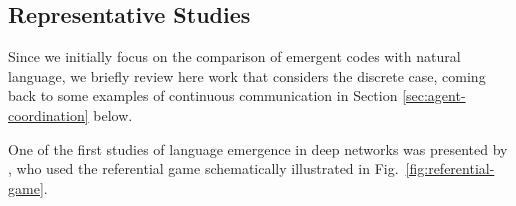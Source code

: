 \subsection{Representative Studies}

Since we initially focus on the comparison of
emergent codes with natural language,
we briefly review here work that considers the discrete case, coming back
to some examples of continuous communication in Section
\ref{sec:agent-coordination} below.

%

One of the first studies of language emergence in deep networks was presented
by , who used the referential game schematically
illustrated in Fig.~\ref{fig:referential-game}. %
%
